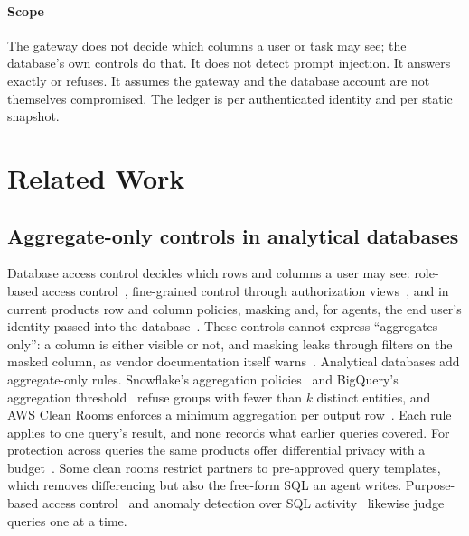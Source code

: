 \documentclass[sigconf,nonacm]{acmart}
\begin{document}
\paragraph{Scope} The gateway does not decide which columns a user or task may see; the database's own controls do that. It does not detect prompt injection. It answers exactly or refuses. It assumes the gateway and the database account are not themselves compromised. The ledger is per authenticated identity and per static snapshot.

\section{Related Work}\label{sec:related}

\subsection{Aggregate-only controls in analytical databases}
Database access control decides which rows and columns a user may see: role-based access control~\cite{sandhu1996rbac}, fine-grained control through authorization views~\cite{rizvi2004extending}, and in current products row and column policies, masking and, for agents, the end user's identity passed into the database~\cite{oracledeepsec}. These controls cannot express ``aggregates only'': a column is either visible or not, and masking leaks through filters on the masked column, as vendor documentation itself warns~\cite{msddm}. Analytical databases add aggregate-only rules. Snowflake's aggregation policies~\cite{snowflakeagg} and BigQuery's aggregation threshold~\cite{bigqueryrules} refuse groups with fewer than $k$ distinct entities, and AWS Clean Rooms enforces a minimum aggregation per output row~\cite{awsminagg}. Each rule applies to one query's result, and none records what earlier queries covered. For protection across queries the same products offer differential privacy with a budget~\cite{bigqueryrules,awsdp,snowflakedp}. Some clean rooms restrict partners to pre-approved query templates, which removes differencing but also the free-form SQL an agent writes. Purpose-based access control~\cite{agrawal2002hippocratic,byun2008purpose} and anomaly detection over SQL activity~\cite{kamra2008detecting} likewise judge queries one at a time.
\end{document}
